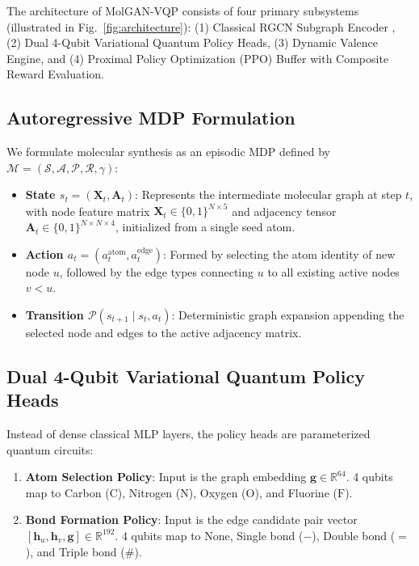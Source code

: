 \documentclass[conference]{IEEEtran}
\begin{document}
The architecture of MolGAN-VQP consists of four primary subsystems (illustrated in Fig.~\ref{fig:architecture}): (1) Classical RGCN Subgraph Encoder \cite{schlichtkrull2018modeling}, (2) Dual 4-Qubit Variational Quantum Policy Heads, (3) Dynamic Valence Engine, and (4) Proximal Policy Optimization (PPO) Buffer \cite{schulman2017} with Composite Reward Evaluation.

\subsection{Autoregressive MDP Formulation}
We formulate molecular synthesis as an episodic MDP defined by $\mathcal{M} = (\mathcal{S}, \mathcal{A}, \mathcal{P}, \mathcal{R}, \gamma)$:
\begin{itemize}
    \item \textbf{State $s_t = (\mathbf{X}_t, \mathbf{A}_t)$}: Represents the intermediate molecular graph at step $t$, with node feature matrix $\mathbf{X}_t \in \{0, 1\}^{N \times 5}$ and adjacency tensor $\mathbf{A}_t \in \{0, 1\}^{N \times N \times 4}$, initialized from a single seed atom.
    \item \textbf{Action $a_t = (a_t^{\text{atom}}, a_t^{\text{edge}})$}: Formed by selecting the atom identity of new node $u$, followed by the edge types connecting $u$ to all existing active nodes $v < u$.
    \item \textbf{Transition $\mathcal{P}(s_{t+1} \mid s_t, a_t)$}: Deterministic graph expansion appending the selected node and edges to the active adjacency matrix.
\end{itemize}

\subsection{Dual 4-Qubit Variational Quantum Policy Heads}
Instead of dense classical MLP layers, the policy heads are parameterized quantum circuits:
\begin{enumerate}
    \item \textbf{Atom Selection Policy}: Input is the graph embedding $\mathbf{g} \in \mathbb{R}^{64}$. 4 qubits map to Carbon ($\text{C}$), Nitrogen ($\text{N}$), Oxygen ($\text{O}$), and Fluorine ($\text{F}$).
    \item \textbf{Bond Formation Policy}: Input is the edge candidate pair vector $[\mathbf{h}_u, \mathbf{h}_v, \mathbf{g}] \in \mathbb{R}^{192}$. 4 qubits map to None, Single bond ($-$), Double bond ($=$), and Triple bond ($\#$).
\end{enumerate}
\end{document}
